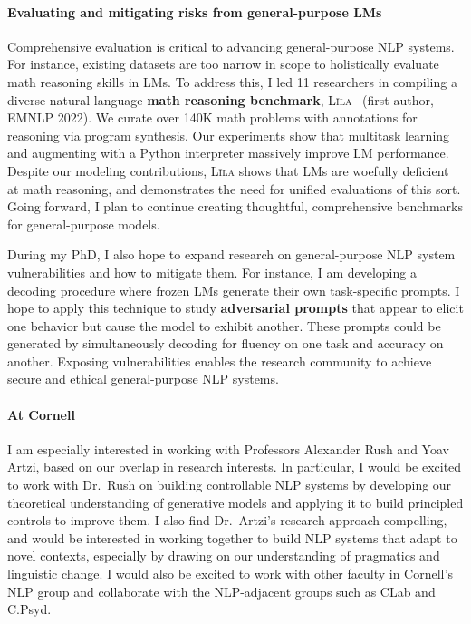 \documentclass[11pt]{article}
\newcommand\lila{\textsc{L\={\i}la}\xspace}
\newcommand\inst{Cornell\xspace}
\begin{document}
\paragraph{Evaluating and mitigating risks from general-purpose LMs}

Comprehensive evaluation is critical to advancing general-purpose NLP systems.
For instance, existing datasets are too narrow in scope 
to holistically evaluate math reasoning skills in LMs.
To address this, I led 11 researchers 
in compiling a diverse natural language 
\textbf{math reasoning benchmark}, 
\lila~\cite{Mishra2022LilaAU} (first-author, EMNLP 2022).
We curate over 140K math problems
with annotations for reasoning via program synthesis. 
Our experiments show that multitask learning 
and augmenting with a Python interpreter
massively improve LM performance. 
Despite our modeling contributions, \lila shows that LMs 
are woefully deficient at math reasoning,
and demonstrates the need for unified evaluations of this sort.
Going forward, I plan to continue 
creating thoughtful, comprehensive benchmarks 
for general-purpose models.

During my PhD, I also hope to expand research 
on general-purpose NLP system vulnerabilities and how to mitigate them.
For instance, I am developing a decoding procedure where frozen LMs 
generate their own task-specific prompts.
I hope to apply this technique
to study \textbf{adversarial prompts}
that appear to elicit one behavior 
but cause the model to exhibit another.
These prompts could be generated by simultaneously 
decoding for fluency on one task and accuracy on another.
Exposing vulnerabilities
enables the research community to achieve
secure and ethical general-purpose NLP systems. 

\paragraph{At \inst} 

I am especially interested in working 
with Professors Alexander Rush and Yoav Artzi,
based on our overlap in research interests. 
In particular, I would be excited to work with Dr.\ Rush 
on building controllable NLP systems 
by developing our theoretical understanding of generative models 
and applying it to build principled controls to improve them. 
I also find Dr.\ Artzi's research approach compelling, 
and would be interested in working together 
to build NLP systems that adapt to novel contexts, 
especially by drawing on our understanding of pragmatics and linguistic change.
I would also be excited to work with other faculty in Cornell's NLP group
and collaborate with the NLP-adjacent groups such as CLab and C.Psyd.



\end{document}
